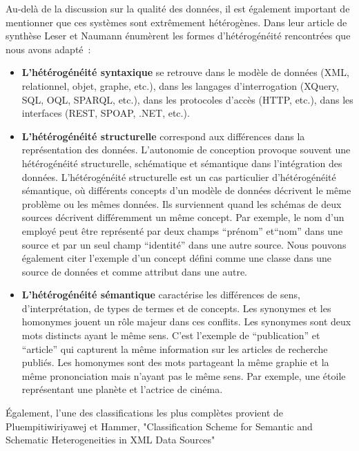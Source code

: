  Au-delà de la discussion sur la qualité des données, il est également important de mentionner que ces systèmes sont extrêmement hétérogènes.
 Dans leur article de synthèse Leser et Naumann énumèrent les formes d'hétérogénéité rencontrées que nous avons adapté~\cite{dils2006}:\\
 
 \begin{itemize}
     \item  \textbf{L'hétérogénéité syntaxique} se retrouve dans le modèle de données (XML, relationnel, objet, graphe, etc.), dans les langages d’interrogation (XQuery, SQL,  OQL, SPARQL, etc.), dans les protocoles d’accès (HTTP, etc.), dans les interfaces (REST, SPOAP, .NET, etc.).\\
      
     \item  \textbf{L'hétérogénéité structurelle} correspond aux différences dans la représentation des données. L'autonomie de conception provoque souvent une hétérogénéité structurelle, schématique et sémantique dans l'intégration des données.  L'hétérogénéité structurelle est un cas particulier d'hétérogénéité sémantique, où différents concepts d'un modèle de données décrivent le même problème ou les mêmes données. Ils surviennent quand les schémas de deux sources décrivent différemment un même concept. Par exemple, le nom d’un employé peut être représenté par deux champs “prénom” et“nom” dans une source et par un seul champ “identité” dans une autre source. Nous pouvons également citer l’exemple d’un concept défini comme une classe dans une source de données et comme attribut dans une autre. \\

     \item  \textbf{L'hétérogénéité sémantique} caractérise les différences de sens, d'interprétation, de types de termes et de concepts. Les synonymes et les homonymes jouent un rôle majeur dans ces conflits. Les synonymes sont deux  mots distincts ayant le même sens. C’est l’exemple de “publication” et  “article” qui capturent la  même information sur les articles de recherche publiés. Les homonymes sont des mots partageant la même graphie et la même prononciation mais n’ayant pas le même sens. Par   exemple,  une étoile représentant une planète et l'actrice de cinéma. \\

 \end{itemize}
 
 
Également, l'une des classifications les plus complètes provient de Pluempitiwiriyawej et Hammer, "Classification Scheme for Semantic and Schematic Heterogeneities in XML Data Sources"~\cite{bergman2006}\\
 

